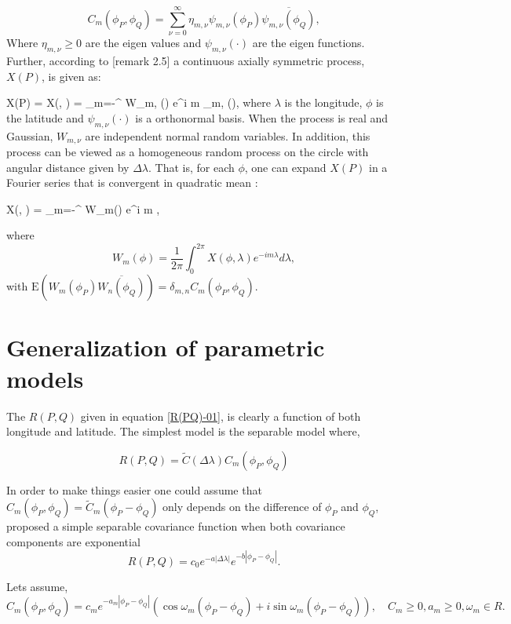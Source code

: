 	\[ C_m(\phi_P,\phi_Q) = \sum_{\nu=0}^{\infty} \eta_{m,\nu}\psi_{m,\nu}(\phi_P)\overline{\psi_{m,\nu}(\phi_Q)},  \]
	Where $\eta_{m,\nu}\ge 0$ are the eigen values and $\psi_{m,\nu}(\cdot)$ are the eigen functions.\\
	
	Further, according to \cite{Huang2012}[remark 2.5] a continuous axially symmetric process, $X(P)$, is given as:
	
	\beq
	X(P) = X(\phi, \lambda) = \sum_{m=-\infty}^{\infty} W_{m, \nu}(\phi) e^{i m \lambda}\psi_{m,\nu} (\phi),
	\eeq
	where $\lambda$ is the longitude, $\phi$ is the latitude and $\psi_{m,\nu}(\cdot)$ is a orthonormal basis. When the process is real and Gaussian, $W_{m,\nu}$ are independent normal random variables. In addition, this process can be viewed as a homogeneous random process on the circle with angular distance given by $\Delta \lambda$. That is, for each $\phi$, one can expand $X(P)$ in a Fourier series that is convergent in quadratic mean \cite{Roy1972}:
	
	\beq
	\label{eq:sym_process} X(\phi, \lambda) = \sum_{m=-\infty}^{\infty} W_m(\phi) e^{i m \lambda}
	\eeq,
	
	where
	\[
		W_m(\phi) = \frac{1}{2\pi} \int_0^{2\pi} X(\phi, \lambda) e^{-i m \lambda} d \lambda,
	\]
	with $\mbox{E}(W_m(\phi_P) \overline{W_n(\phi_Q)}) = \delta_{m,n} C_m(\phi_P, \phi_Q)$. \\
	
	\section{Generalization of parametric models}
	
	The $R(P,Q)$ given in equation \ref{R(PQ)-01}, is clearly a function of both longitude and latitude. The simplest model is the separable model where,
	
	\[
		R(P,Q) = \tilde{C}(\Delta\lambda)C_m(\phi_P,\phi_Q)
	\]
	
	In order to make things easier one could assume that $C_m(\phi_P, \phi_Q) = \tilde{C}_m(\phi_P - \phi_Q)$ only depends on the difference of $\phi_P$ and $\phi_Q$, \cite{HuangZhangRobeson2011} proposed a simple separable covariance function when both covariance components are exponential
	\[
		R(P, Q) = c_0e^{-a|\Delta \lambda|}e^{-b|\phi_P - \phi_Q|}.
	\]
	
	Lets assume,
	\[
		C_m(\phi_P,\phi_Q)=c_m e^{-a_m|\phi_P-\phi_Q|}(\cos\omega_m(\phi_P-\phi_Q)+i\sin\omega_m(\phi_P-\phi_Q)), \quad C_m \ge 0,a_m\ge0,\omega_m\in R.
	\]
	
